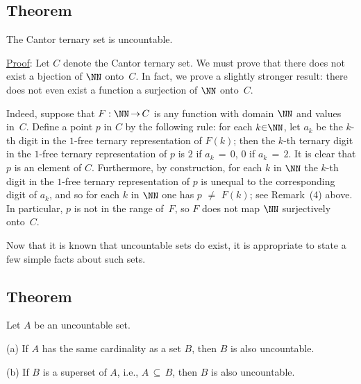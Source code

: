 {\VV

            \subsection{\small{\bf Theorem}}
            \label{ThmA20.110}

        The Cantor ternary set is uncountable.

\V
        \underline{Proof}: Let $C$ denote the Cantor ternary set. We must prove that there does not exist a bjection of ${\NN}$ onto~$C$.
    In fact, we prove a slightly stronger result: there does not even exist a function a surjection of ${\NN}$ onto~$C$.

        Indeed, suppose that $F:{\NN} \,{\rightarrow}\, C$ is any function with domain ${\NN}$ and values in~$C$.
    Define a point $p$ in $C$ by the following rule: for each $k{\in}{\NN}$, let $a_{k}$ be the $k$-th digit in the $1$-free ternary representation of $F(k)$;
    then the $k$-th ternary digit in the $1$-free ternary representation of $p$ is $2$ if $a_{k} \,=\, 0$, $0$ if $a_{k} \,=\, 2$.
    It is clear that $p$ is an element of $C$. Furthermore, by construction, for each $k$ in ${\NN}$ the $k$-th digit
    in the $1$-free ternary representation of $p$ is unequal to the corresponding digit of $a_{k}$,
    and so for each $k$ in ${\NN}$ one has $p \,\,{\neq}\,\, F(k)$; see Remark~(4) above.
    In particular, $p$ is not in the range of~$F$, so $F$ does not map ${\NN}$ surjectively onto~$C$.

\V


        Now that it is known that uncountable sets do exist, it is appropriate to state a few simple facts about such sets.



            \subsection{\small{\bf Theorem}}
            \label{ThmA20.112}

\V

        Let $A$ be an uncountable set.

\V

        (a) If $A$ has the same cardinality as a set $B$, then $B$ is also uncountable.

\V

        (b) If $B$ is a superset of $A$, i.e., $A \,{\subseteq}\, B$, then $B$ is also uncountable.

\V

}
